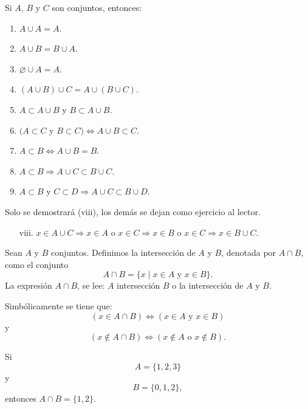 \begin{prop}{}{}
    Si $A$, $B$ y $C$ son conjuntos, entonces:
    \begin{enumerate}[label=\roman*., topsep=6pt, itemsep=0pt]
        \item $A \cup A = A$.
        \item $A \cup B = B \cup A$.
        \item $\varnothing \cup A = A$.
        \item $(A \cup B) \cup C = A \cup(B \cup C)$.
        \item $A \subset A \cup B$ y $B \subset A \cup B$.
        \item $(A \subset C$ y $B \subset C) \Longleftrightarrow A \cup B \subset C$.
        \item $A \subset B \Longleftrightarrow A \cup B=B$.
        \item $A \subset B \Longrightarrow A \cup C \subset B \cup C$.
        \item $A \subset B$ y $C \subset D \Longrightarrow A \cup C \subset B \cup D$.
    \end{enumerate}
    \tcblower
    \demostracion Solo se demostrará (viii), los demás se dejan como ejercicio al lector.
    \begin{enumerate}[label=\roman*., topsep=6pt, itemsep=0pt]
        \item[viii.] $x \in A \cup C \Longrightarrow x \in A$ o $x \in C \Longrightarrow x \in B$ o $x \in C \Longrightarrow x \in B \cup C$.
    \end{enumerate}
\end{prop}

\newpage

\begin{definicion}{}{}
    Sean $A$ y $B$ conjuntos. Definimos la intersección de $A$ y $B$, denotada por $A \cap B$, como el conjunto
    $$A \cap B = \{x \mid x \in A \text { y } x \in B\}.$$
    La expresión $A \cap B$, se lee: $A$ intersección $B$ o la intersección de $A$ y $B$.
\end{definicion}

Simbólicamente se tiene que:
$$(x \in A \cap B) \Longleftrightarrow(x \in A \text { y } x \in B)$$
y
$$(x \notin A \cap B) \Longleftrightarrow(x \notin A \text { o } x \notin B).$$

\begin{examplebox}{}{}
    Si
    $$A = \{1,  2,  3\}$$
    y
    $$B = \{0,  1,  2\},$$
    entonces $A \cap B = \{1,  2\}$.
\end{examplebox}


